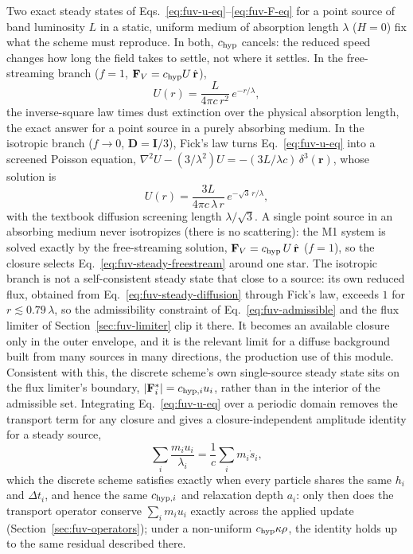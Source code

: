 Two exact steady states of Eqs.~\ref{eq:fuv-u-eq}--\ref{eq:fuv-F-eq}
for a point source of band luminosity $L$ in a static, uniform medium
of absorption length $\lambda$ ($H=0$) fix what the scheme must
reproduce. In both, $c_{\rm hyp}$ cancels: the reduced speed changes how
long the field takes to settle, not where it settles. In the
free-streaming branch ($f=1$, $\mathbf F_V = c_{\rm hyp} U\,\hat{\mathbf
r}$),
\begin{equation}
  U(r) = \frac{L}{4\pi c\,r^2}\,e^{-r/\lambda} ,
  \label{eq:fuv-steady-freestream}
\end{equation}
the inverse-square law times dust extinction over the physical
absorption length, the exact answer for a point source in a purely
absorbing medium. In the isotropic branch ($f\to0$, $\mathbf D = \mathbf
I/3$), Fick's law turns Eq.~\ref{eq:fuv-u-eq} into a screened Poisson
equation, $\nabla^2 U - (3/\lambda^2)U = -(3L/\lambda c)\,\delta^3(\mathbf
r)$, whose solution is
\begin{equation}
  U(r) = \frac{3L}{4\pi c\,\lambda\,r}\,e^{-\sqrt3\,r/\lambda} ,
  \label{eq:fuv-steady-diffusion}
\end{equation}
with the textbook diffusion screening length $\lambda/\sqrt3$. A
single point source in an absorbing medium never isotropizes (there is
no scattering): the M1 system is solved exactly by the free-streaming
solution, $\mathbf F_V = c_{\rm hyp}\,U\,\hat{\mathbf r}$ ($f=1$), so the closure
selects Eq.~\ref{eq:fuv-steady-freestream} around one star. The
isotropic branch is not a self-consistent steady state that close to a
source: its own reduced flux, obtained from Eq.~\ref{eq:fuv-steady-diffusion}
through Fick's law, exceeds $1$ for $r\lesssim0.79\,\lambda$, so the
admissibility constraint of Eq.~\ref{eq:fuv-admissible} and the flux
limiter of Section~\ref{sec:fuv-limiter} clip it there. It becomes an
available closure only in the outer envelope, and it is the relevant
limit for a diffuse background built from many sources in many
directions, the production use of this module. Consistent with this, the
discrete scheme's own single-source steady state sits on the flux
limiter's boundary, $|\mathbf F_i^\ast| = c_{{\rm hyp},i}u_i$, rather than
in the interior of the admissible set. Integrating Eq.~\ref{eq:fuv-u-eq}
over a periodic domain removes the transport term for any closure and
gives a closure-independent amplitude identity for a steady source,
\begin{equation}
  \sum_i \frac{m_i u_i}{\lambda_i} = \frac{1}{c}\sum_i m_i \dot s_i ,
  \label{eq:fuv-amplitude-identity}
\end{equation}
which the discrete scheme satisfies exactly when every particle shares
the same $h_i$ and $\Delta t_i$, and hence the same $c_{{\rm hyp},i}$ and
relaxation depth $a_i$: only then does the transport operator conserve
$\sum_i m_i u_i$ exactly across the applied update
(Section~\ref{sec:fuv-operators}); under a non-uniform
$c_{\rm hyp}\kappa\rho$, the identity holds up to the same residual described there.


